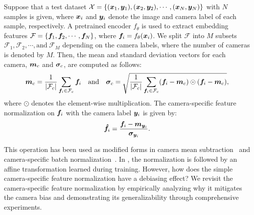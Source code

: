 Suppose that a test dataset $\mathcal{X} = \{ (\bm{x}_1, \bm{y}_1), (\bm{x}_2, \bm{y}_2), \cdots, (\bm{x}_N, \bm{y}_N) \}$ with $N$ samples is given, where $\bm{x}_i$ and $\bm{y}_i$ denote the image and camera label of each sample, respectively.
A pretrained encoder $f_\theta$ is used to extract embedding features $\mathcal{F} = \{ \bm{f}_1, \bm{f}_2, \cdots, \bm{f}_N \}$, where $\bm{f}_i = f_\theta(\bm{x}_i)$.
We split $\mathcal{F}$ into $M$ subsets $\mathcal{F}_1, \mathcal{F}_2, \cdots, \text{and} ~  \mathcal{F}_M$ depending on the camera labels, where the number of cameras is denoted by $M$.
Then, the mean and standard deviation vectors for each camera, $\bm{m}_c$ and $\bm{\sigma}_c$, are computed as follows:
\begin{equation}
    \bm{m}_c = \frac{1}{|\mathcal{F}_c|} \sum_{\bm{f}_i \in \mathcal{F}_c}^{} \bm{f}_i ~~~ \text{and} ~~~
    \bm{\sigma}_c = \sqrt{\frac{1}{|\mathcal{F}_c|} \sum_{\bm{f}_i \in \mathcal{F}_c}^{} (\bm{f}_i - \bm{m}_c) \odot (\bm{f}_i - \bm{m}_c)},
\end{equation}
where $\odot$ denotes the element-wise multiplication.
The camera-specific feature normalization on $\bm{f}_i$ with the camera label $\bm{y}_i$ is given by: 
\begin{equation}
    \label{eq:fd}
    \bm{\hat{f}}_i = \frac{\bm{f}_i - \bm{m}_{\bm{y}_i}}{\bm{\sigma}_{\bm{y}_i}}.
\end{equation}


This operation has been used as modified forms in camera mean subtraction~\citep{gu20201st,luo2021empirical} and camera-specific batch normalization~\citep{zhuang2020rethinking}. 
In \citet{zhuang2020rethinking}, the normalization is followed by an affine transformation learned during training. 
However, how does the simple camera-specific feature normalization have a debiasing effect?
We revisit the camera-specific feature normalization by empirically analyzing why it mitigates the camera bias and demonstrating its generalizability through comprehensive experiments.


